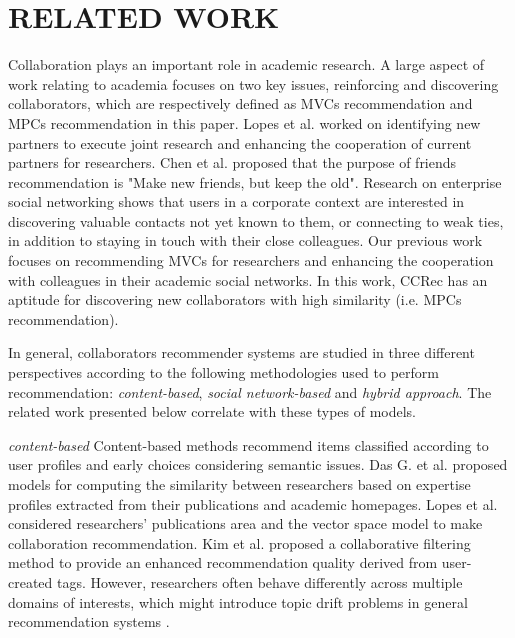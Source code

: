 \documentclass[review]{elsarticle}
\begin{document}
\section{RELATED WORK}
Collaboration plays an important role in academic research. A large aspect of work relating to academia focuses on two key issues, reinforcing and discovering collaborators, which are respectively defined as MVCs recommendation and MPCs recommendation in this paper. Lopes et al. \cite{lopes2010collaboration} worked on identifying new partners to execute joint research and enhancing the cooperation of current partners for researchers. Chen et al. \cite{chen2009make} proposed that the purpose of friends recommendation is "Make new friends, but keep the old". Research on enterprise social networking \cite{dimicco2008motivations} shows that users in a corporate context are interested in discovering valuable contacts not yet known to them, or connecting to weak ties, in addition to staying in touch with their close colleagues. Our previous work \cite{li2014acrec} focuses on recommending MVCs for researchers and enhancing the cooperation with colleagues in their academic social networks. In this work, CCRec has an aptitude for discovering new collaborators with high similarity (i.e. MPCs recommendation).

In general, collaborators recommender systems are studied in three different perspectives according to the following methodologies used to perform recommendation: \emph{content-based}, \emph{social network-based} and \emph{hybrid approach}. The related work presented below correlate with these types of models.

\emph{content-based} Content-based methods recommend items classified according to user profiles and early choices considering semantic issues. Das G. et al. \cite{gollapalli2012similar} proposed models for computing the similarity between researchers based on expertise profiles extracted from their publications and academic homepages. Lopes et al. \cite{lopes2010collaboration} considered researchers' publications area and the vector space model to make collaboration recommendation. Kim et al. \cite{kim2010collaborative} proposed a collaborative filtering method to provide an enhanced recommendation quality derived from user-created tags. However, researchers often behave differently across multiple domains of interests, which might introduce topic drift problems in general recommendation systems \cite{tang2012cross}.
\end{document}
